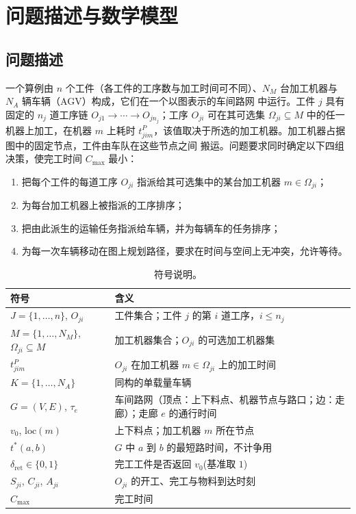 \documentclass[manuscript,screen,review]{acmart}
\begin{document}
\section{问题描述与数学模型}
\label{sec:Chapter_III}
\subsection{问题描述}

一个算例由 $n$ 个工件（各工件的工序数与加工时间可不同）、$N_M$ 台加工机器与 $N_A$ 辆车辆（AGV）构成，它们在一个以图表示的车间路网
中运行。工件 $j$ 具有固定的 $n_j$ 道工序链 $O_{j1}\to\cdots\to O_{jn_j}$；工序 $O_{ji}$
可在其可选集 $\Omega_{ji}\subseteq M$ 中的任一机器上加工，在机器 $m$ 上耗时
$t^P_{jim}$，该值取决于所选的加工机器。加工机器占据图中的固定节点，工件由车队在这些节点之间
搬运。问题要求同时确定以下四组决策，使完工时间 $C_{\max}$ 最小：

\begin{enumerate}[label=(\roman*),leftmargin=*,topsep=2pt,itemsep=1pt]
\item 把每个工件的每道工序 $O_{ji}$ 指派给其可选集中的某台加工机器 $m\in\Omega_{ji}$；
\item 为每台加工机器上被指派的工序排序；
\item 把由此派生的运输任务指派给车辆，并为每辆车的任务排序；
\item 为每一次车辆移动在图上规划路径，要求在时间与空间上无冲突，允许等待。
\end{enumerate}


\begin{table}[t]
\caption{符号说明。}
\label{tab:notation}
\small
\begin{tabular}{@{}ll@{}}
\toprule
符号 & 含义 \\
\midrule
$J=\{1,\dots,n\}$, $O_{ji}$ & 工件集合；工件 $j$ 的第 $i$ 道工序，$i\le n_j$ \\
$M=\{1,\dots,N_M\}$, $\Omega_{ji}\subseteq M$ & 加工机器集合；$O_{ji}$ 的可选加工机器集 \\
$t^P_{jim}$ & $O_{ji}$ 在加工机器 $m\in\Omega_{ji}$ 上的加工时间 \\
$K=\{1,\dots,N_A\}$ & 同构的单载量车辆 \\
$G=(V,E)$, $\tau_e$ & 车间路网（顶点：上下料点、机器节点与路口；边：走廊）；走廊 $e$ 的通行时间 \\
$v_0$, $\mathrm{loc}(m)$ & 上下料点；加工机器 $m$ 所在节点 \\
$t^{*}(a,b)$ & $G$ 中 $a$ 到 $b$ 的最短路时间，不计争用 \\
$\delta_{\mathrm{ret}}\in\{0,1\}$ & 完工工件是否返回 $v_0$(基准取 $1$) \\
$S_{ji}$, $C_{ji}$, $A_{ji}$ & $O_{ji}$ 的开工、完工与物料到达时刻 \\
$C_{\max}$ & 完工时间 \\
\bottomrule
\end{tabular}
\end{table}
\end{document}
